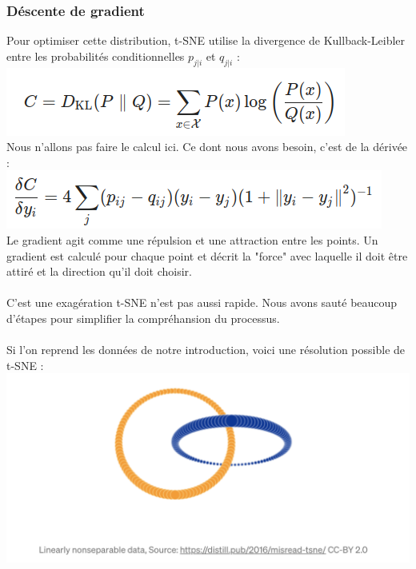 \subsubsection*{Déscente de gradient}
Pour optimiser cette distribution, t-SNE utilise la divergence de Kullback-Leibler entre les probabilités conditionnelles $p_{j|i}$ et $q_{j|i}$ :
\\
\includegraphics[width=\linewidth]{./img/reduction_dim/t_sne/desc_grad_1.png}
\\
Nous n'allons pas faire le calcul ici. Ce dont nous avons besoin, c'est de la dérivée :
\\
\includegraphics[width=\linewidth]{./img/reduction_dim/t_sne/desc_grad_2.png}
\\
Le gradient agit comme une répulsion et une attraction entre les points. Un gradient est calculé pour chaque point et décrit la "force" avec laquelle il doit être attiré et la direction qu'il doit choisir.
\\
\\
C'est une exagération t-SNE n'est pas aussi rapide. Nous avons sauté beaucoup d'étapes pour simplifier la compréhansion du processus.
\\
\\
Si l'on reprend les données de notre introduction, voici une résolution possible de t-SNE : 
\\
\includegraphics[width=\linewidth]{./img/reduction_dim/t_sne/exemple_data}
